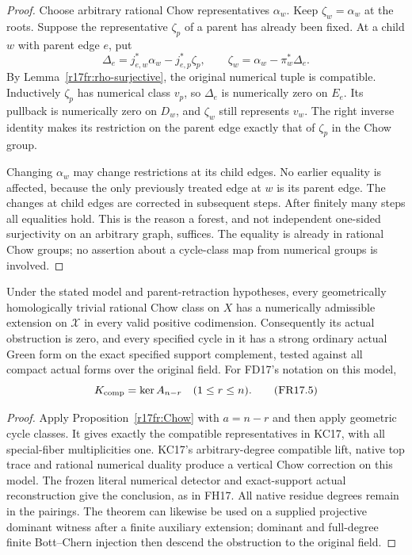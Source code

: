 \begin{proof}
Choose arbitrary rational Chow representatives $\alpha_w$.
Keep $\zeta_w=\alpha_w$ at the roots.  Suppose the representative
$\zeta_p$ of a parent has already been fixed.  At a child $w$
with parent edge $e$, put
\[
 \Delta_e=j_{e,w}^*\alpha_w-j_{e,p}^*\zeta_p,
 \qquad
 \zeta_w=\alpha_w-\pi_w^*\Delta_e.
 \tag{FR17.4}\label{r17fr:alignment}
\]
By Lemma~\ref{r17fr:rho-surjective}, the original numerical
tuple is compatible.  Inductively $\zeta_p$ has numerical
class $v_p$, so $\Delta_e$ is numerically zero on $E_e$.
Its pullback is numerically zero on $D_w$, and $\zeta_w$
still represents $v_w$.  The right inverse identity makes
its restriction on the parent edge exactly that of
$\zeta_p$ in the Chow group.

Changing $\alpha_w$ may change restrictions at its child
edges.  No earlier equality is affected, because the only
previously treated edge at $w$ is its parent edge.  The
changes at child edges are corrected in subsequent steps.
After finitely many steps all equalities hold.  This is the
reason a forest, and not independent one-sided surjectivity
on an arbitrary graph, suffices.  The equality is already
in rational Chow groups; no assertion about a cycle-class
map from numerical groups is involved.
\end{proof}

\begin{theorem}
\label{r17fr:actual}
Under the stated model and parent-retraction hypotheses,
every geometrically homologically trivial rational Chow
class on $X$ has a numerically admissible extension on
$\mathcal X$ in every valid positive codimension.
Consequently its actual obstruction is zero, and every
specified cycle in it has a strong ordinary actual Green
form on the exact specified support complement, tested
against all compact actual forms over the original field.
For FD17's notation on this model,
\[
                   K_{\rm comp}=\ker A_{n-r}
                        \quad(1\le r\le n).
 \tag{FR17.5}\label{r17fr:compatible}
\]
\end{theorem}

\begin{proof}
Apply Proposition~\ref{r17fr:Chow} with $a=n-r$ and then
apply geometric cycle classes.  It gives exactly the
compatible representatives in KC17, with all special-fiber
multiplicities one.  KC17's arbitrary-degree compatible
lift, native top trace and rational numerical duality
produce a vertical Chow correction on this model.
The frozen literal numerical detector and exact-support
actual reconstruction give the conclusion, as in FH17.
All native residue degrees remain in the pairings.  The
theorem can likewise be used on a supplied projective
dominant witness after a finite auxiliary extension;
dominant and full-degree finite Bott--Chern injection
then descend the obstruction to the original field.
\end{proof}


